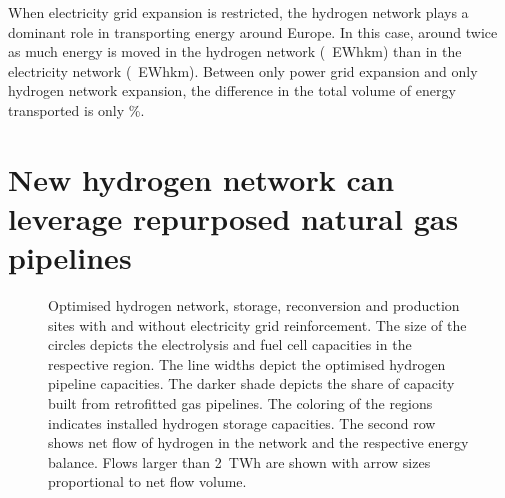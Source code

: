 When electricity grid expansion is restricted, the hydrogen network plays a
dominant role in transporting energy around Europe. In this case, around twice
as much energy is moved in the hydrogen network (\ewhkmhydrogen~EWhkm) than in
the electricity network (\ewhkmelectricity~EWhkm). Between only power grid
expansion and only hydrogen network expansion, the difference in the total
volume of energy transported is only \ewhkmdiff\%.

\section*{New hydrogen network can leverage repurposed natural gas pipelines}
\label{sec:repurposed}

\begin{figure}
    \centering
      \caption{Optimised hydrogen network, storage, reconversion and production
    sites with and without electricity grid reinforcement. The size of the
    circles depicts the electrolysis and fuel cell capacities in the respective
    region. The line widths depict the optimised hydrogen pipeline capacities.
    The darker shade depicts the share of capacity built from retrofitted gas
    pipelines. The coloring of the regions indicates installed hydrogen storage
    capacities. The second row shows net flow of hydrogen in the network and the
    respective energy balance. Flows larger than 2~TWh are shown with arrow
    sizes proportional to net flow volume.}
    \label{fig:h2-network}
\end{figure}

